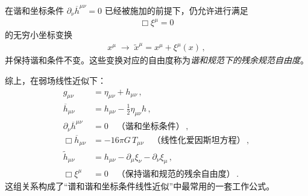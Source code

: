 \begin{definition}[谐和规范下的残余规范变换]
在谐和坐标条件 $\partial_{\nu}\overline{h}^{\mu\nu}=0$ 已经被施加的前提下，仍允许进行满足
\begin{align}
\Box\xi^{\mu} = 0
\end{align}
的无穷小坐标变换
\begin{align}
x^{\mu}\;\longrightarrow\;\widetilde{x}^{\mu}
=
x^{\mu} + \xi^{\mu}(x)\,,
\end{align}
并保持谐和条件不变。这些变换对应的自由度称为\emph{谐和规范下的残余规范自由度}。
\end{definition}


综上，在弱场线性近似下：
\begin{align}
g_{\mu\nu}
&=
\eta_{\mu\nu} + h_{\mu\nu}\,,
\\[0.3em]
\overline{h}_{\mu\nu}
&=
h_{\mu\nu}
-
\frac{1}{2}\eta_{\mu\nu}h\,,
\\[0.3em]
\partial_{\nu}\overline{h}^{\mu\nu} &= 0 \quad \text{（谐和坐标条件）}\,,
\\[0.3em]
\Box\overline{h}_{\mu\nu}
&=
-16\pi G\,T_{\mu\nu}\quad \text{（线性化爱因斯坦方程）}\,,
\\[0.3em]
\widetilde{h}_{\mu\nu}
&=
h_{\mu\nu}
-
\partial_{\mu}\xi_{\nu}
-
\partial_{\nu}\xi_{\mu}\,,
\\[0.3em]
\Box\xi^{\mu}
&= 0 \quad \text{（保持谐和规范的残余自由度）}\,.
\end{align}
这组关系构成了“谱和谐和坐标条件线性近似”中最常用的一套工作公式。

